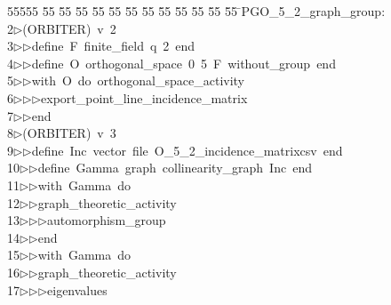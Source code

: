%
%
\begin{tabbing}
55555 \= 55 \= 55 \= 55 \= 55 \= 55 \= 55 \= 55 \= 55 \= 55 \= 55 \= 55 \= 55 \= \>PGO\_5\_2\_graph\_group:\\[0pt]
2\>$\triangleright$\>(ORBITER)\ v\ 2\ \\[0pt]
3\>$\triangleright$\>$\triangleright$\>define\ F\ finite\_field\ q\ 2\ end\ \\[0pt]
4\>$\triangleright$\>$\triangleright$\>define\ O\ orthogonal\_space\ 0\ 5\ F\ without\_group\ end\ \\[0pt]
5\>$\triangleright$\>$\triangleright$\>with\ O\ do\ orthogonal\_space\_activity\ \\[0pt]
6\>$\triangleright$\>$\triangleright$\>$\triangleright$\>export\_point\_line\_incidence\_matrix\ \\[0pt]
7\>$\triangleright$\>$\triangleright$\>end\\[0pt]
8\>$\triangleright$\>(ORBITER)\ v\ 3\ \\[0pt]
9\>$\triangleright$\>$\triangleright$\>define\ Inc\ vector\ file\ O\_5\_2\_incidence\_matrixcsv\ end\ \\[0pt]
10\>$\triangleright$\>$\triangleright$\>define\ Gamma\ graph\ collinearity\_graph\ Inc\ end\ \\[0pt]
11\>$\triangleright$\>$\triangleright$\>with\ Gamma\ do\ \\[0pt]
12\>$\triangleright$\>$\triangleright$\>graph\_theoretic\_activity\ \\[0pt]
13\>$\triangleright$\>$\triangleright$\>$\triangleright$\>automorphism\_group\ \\[0pt]
14\>$\triangleright$\>$\triangleright$\>end\ \\[0pt]
15\>$\triangleright$\>$\triangleright$\>with\ Gamma\ do\ \\[0pt]
16\>$\triangleright$\>$\triangleright$\>graph\_theoretic\_activity\ \\[0pt]
17\>$\triangleright$\>$\triangleright$\>$\triangleright$\>eigenvalues\ \\[0pt]

\end{tabbing}

